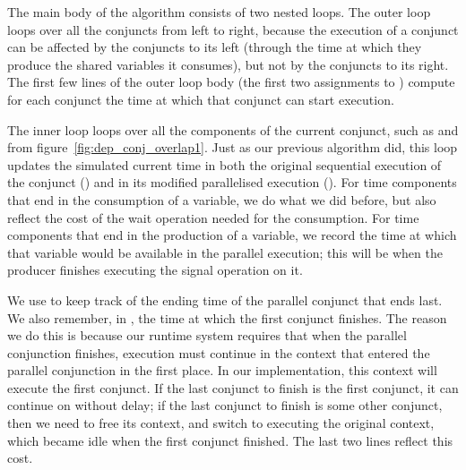 The main body of the algorithm consists of two nested loops.
The outer loop loops over all the conjuncts from left to right,
because the execution of a conjunct can be affected
by the conjuncts to its left
(through the time at which they produce the shared variables it consumes),
but not by the conjuncts to its right.
The first few lines of the outer loop body
(the first two assignments to )
compute for each conjunct
the time at which that conjunct can start execution.

The inner loop loops over all the components of the current conjunct,
such as  and 
from figure~\ref{fig:dep_conj_overlap1}.
Just as our previous algorithm did,
this loop updates the simulated current time
in both the original sequential execution of the conjunct ()
and in its modified parallelised execution ().
For time components that end in the consumption of a variable,
we do what we did before,
but also reflect the cost of the wait operation needed for the consumption.
For time components that end in the production of a variable,
we record the time at which
that variable would be available in the parallel execution;
this will be when the producer finishes executing the signal operation on it.

We use  to keep track of the ending time
of the parallel conjunct that ends last.
We also remember, in ,
the time at which the first conjunct finishes.
The reason we do this is because
our runtime system requires that
when the parallel conjunction finishes,
execution must continue in the context
that entered the parallel conjunction in the first place.
In our implementation, this context will execute the first conjunct.
If the last conjunct to finish is the first conjunct,
it can continue on without delay;
if the last conjunct to finish is some other conjunct,
then we need to free its context,
and switch to executing the original context,
which became idle when the first conjunct finished.
The last two lines reflect this cost.



